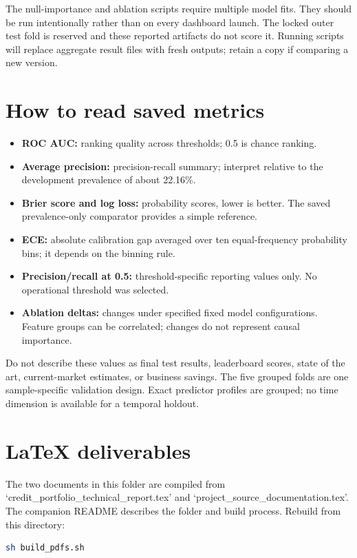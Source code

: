 \documentclass[11pt,letterpaper]{article}
\begin{document}
The null-importance and ablation scripts require multiple model fits. They should be run intentionally rather than on every dashboard launch. The locked outer test fold is reserved and these reported artifacts do not score it. Running scripts will replace aggregate result files with fresh outputs; retain a copy if comparing a new version.

\section{How to read saved metrics}
\begin{itemize}
  \item \textbf{ROC AUC:} ranking quality across thresholds; 0.5 is chance ranking.
  \item \textbf{Average precision:} precision-recall summary; interpret relative to the development prevalence of about 22.16\%.
  \item \textbf{Brier score and log loss:} probability scores, lower is better. The saved prevalence-only comparator provides a simple reference.
  \item \textbf{ECE:} absolute calibration gap averaged over ten equal-frequency probability bins; it depends on the binning rule.
  \item \textbf{Precision/recall at 0.5:} threshold-specific reporting values only. No operational threshold was selected.
  \item \textbf{Ablation deltas:} changes under specified fixed model configurations. Feature groups can be correlated; changes do not represent causal importance.
\end{itemize}

Do not describe these values as final test results, leaderboard scores, state of the art, current-market estimates, or business savings. The five grouped folds are one sample-specific validation design. Exact predictor profiles are grouped; no time dimension is available for a temporal holdout.

\section{LaTeX deliverables}
The two documents in this folder are compiled from `credit\_portfolio\_technical\_report.tex' and `project\_source\_documentation.tex'. The companion README describes the folder and build process. Rebuild from this directory:

\begin{lstlisting}[language=bash]
sh build_pdfs.sh
\end{lstlisting}
\end{document}
